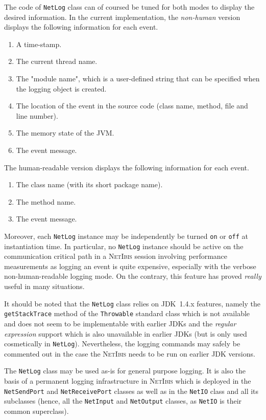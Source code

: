 \documentclass[11pt]{book}
\def\NetIbis{\textsc{NetIbis}\xspace}
\begin{document}
The code of \texttt{NetLog} class can of coursed be tuned for both
modes to display the desired information. In the current
implementation, the \emph{non-human} version displays the following
information for each event.
\begin{enumerate}
\item A time-stamp.
\item The current thread name.
\item The "module name", which is a user-defined string that can be
  specified when the logging object is created.
\item The location of the event in the source code (class name, method, file
  and line number).
\item The memory state of the JVM.
\item The event message.
\end{enumerate}
The human-readable version displays the following information for each
event.
\begin{enumerate}
\item The class name (with its short package name).
\item The method name.
\item The event message.
\end{enumerate}

Moreover, each \texttt{NetLog} instance may be independently be turned
\texttt{on} or \texttt{off} at instantiation time. In particular, no
\texttt{NetLog} instance should be active on the communication
critical path in a \NetIbis session involving performance measurements
as logging an event is quite expensive, especially with the verbose
non-human-readable logging mode. On the contrary, this feature has
proved \emph{really} useful in many situations.

It should be noted that the \texttt{NetLog} class relies on JDK~1.4.x
features, namely the \texttt{getStackTrace} method of the
\texttt{Throwable} standard class which is not available and does not
seem to be implementable with earlier JDKs and the \emph{regular
  expression} support which is also unavailable in earlier JDKs (but
is only used cosmetically in \texttt{NetLog}). Nevertheless, the
logging commands may safely be commented out in the case the \NetIbis
needs to be run on earlier JDK versions.

The \texttt{NetLog} class may be used as-is for general purpose
logging. It is also the basis of a permanent logging infrastructure in
\NetIbis which is deployed in the \texttt{NetSendPort} and
\texttt{NetReceivePort} classes as well as in the \texttt{NetIO} class
and all its subclasses (hence, all the \texttt{NetInput} and
\texttt{NetOutput} classes, as \texttt{NetIO} is their common superclass).
\end{document}
